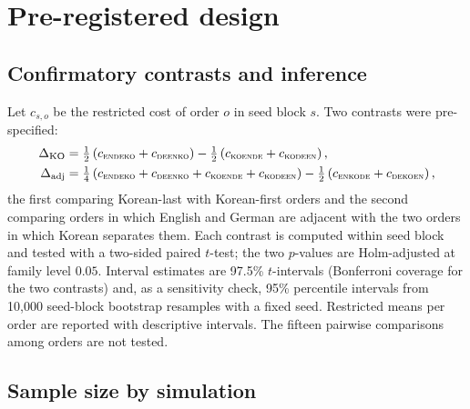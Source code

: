 \documentclass[preprint,12pt,authoryear]{elsarticle}
\newcommand{\ko}{\textsc{ko}}
\newcommand{\en}{\textsc{en}}
\newcommand{\de}{\textsc{de}}
\begin{document}
\section{Pre-registered design}
\label{sec:design}

\subsection{Confirmatory contrasts and inference}

Let $c_{s,o}$ be the restricted cost of order $o$ in seed block $s$. Two contrasts were pre-specified:
\begin{align}
\Delta_{\mathrm{KO}} &= \tfrac{1}{2}\left(c_{\en\de\ko}+c_{\de\en\ko}\right)-\tfrac{1}{2}\left(c_{\ko\en\de}+c_{\ko\de\en}\right), \\
\Delta_{\mathrm{adj}} &= \tfrac{1}{4}\left(c_{\en\de\ko}+c_{\de\en\ko}+c_{\ko\en\de}+c_{\ko\de\en}\right)-\tfrac{1}{2}\left(c_{\en\ko\de}+c_{\de\ko\en}\right),
\end{align}
the first comparing Korean-last with Korean-first orders and the second comparing orders in which English and German are adjacent with the two orders in which Korean separates them. Each contrast is computed within seed block and tested with a two-sided paired $t$-test; the two $p$-values are Holm-adjusted \citep{holm1979} at family level $0.05$. Interval estimates are 97.5\% $t$-intervals (Bonferroni coverage for the two contrasts) and, as a sensitivity check, 95\% percentile intervals from 10{,}000 seed-block bootstrap resamples with a fixed seed. Restricted means per order are reported with descriptive intervals. The fifteen pairwise comparisons among orders are not tested.

\subsection{Sample size by simulation}
\label{sec:samplesize}
\end{document}
